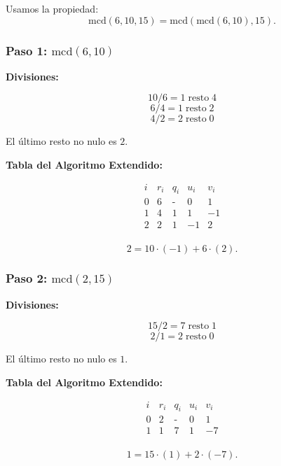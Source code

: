 \documentclass[a4paper,12pt]{article}
\begin{document}
\begin{ejemplo}[title={Cálculo de \(\text{mcd}(6,10,15)\)}]
Usamos la propiedad:
\[
\text{mcd}(6,10,15) = \text{mcd}(\text{mcd}(6,10),15).
\]

\subsubsection*{Paso 1: \(\text{mcd}(6,10)\)}

\textbf{Divisiones:}

\[
10 / 6 = 1 \;\text{resto}\; 4
\]
\[
6 / 4 = 1 \;\text{resto}\; \boxed{2}
\]
\[
4 / 2 = 2 \;\text{resto}\; 0
\]

El último resto no nulo es \(\boxed{2}\).

\bigskip

\textbf{Tabla del Algoritmo Extendido:}

\[
\begin{array}{c|c|c|c|c}
i & r_i & q_i & u_i & v_i \\
\hline
0 & 6 & \text{-} & 0 & 1 \\
1 & 4 & 1 & 1 & -1 \\
2 & \boxed{2} & 1 & -1 & 2 \\
\end{array}
\]

\[
\boxed{2} = 10 \cdot (-1) + 6 \cdot (2).
\]

\vspace{1em}

\subsubsection*{Paso 2: \(\text{mcd}(2,15)\)}

\textbf{Divisiones:}

\[
15 / 2 = 7 \;\text{resto}\; \boxed{1}
\]
\[
2 / 1 = 2 \;\text{resto}\; 0
\]

El último resto no nulo es \(\boxed{1}\).

\bigskip

\textbf{Tabla del Algoritmo Extendido:}

\[
\begin{array}{c|c|c|c|c}
i & r_i & q_i & u_i & v_i \\
\hline
0 & 2 & \text{-} & 0 & 1 \\
1 & \boxed{1} & 7 & 1 & -7 \\
\end{array}
\]

\[
\boxed{1} = 15 \cdot (1) + 2 \cdot (-7).
\]
\end{ejemplo}
\end{document}

